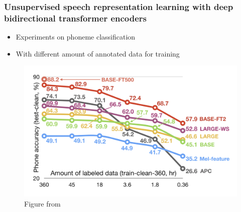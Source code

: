 \documentclass[table]{beamer}
\begin{document}
\begin{frame}
\frametitle{Unsupervised speech representation learning with deep bidirectional transformer encoders}

		\begin{itemize}
			\item Experiments on phoneme classification
			\item With different amount of annotated data for training
		\end{itemize} 


		\begin{figure}
			\centering
			\includegraphics[scale=0.3]	{mockingjay-exp} 
			\caption{Figure from  \citep{Liu_2020}}
			\end{figure}

\end{frame}
\end{document}
